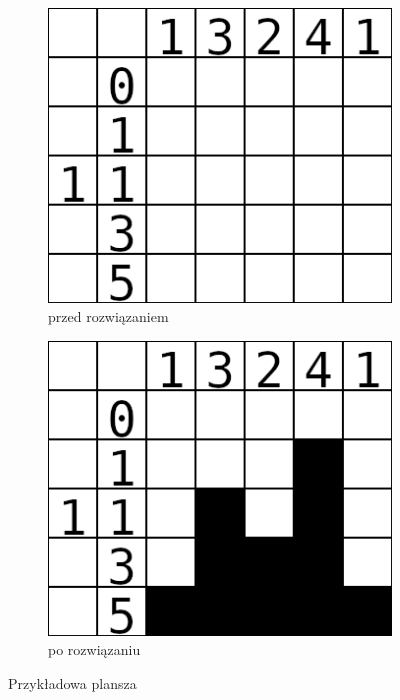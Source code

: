 \begin{figure}[!htb]
    \centering
    \begin{subfigure}[b]{0.3\textwidth}
        \centering
        \includegraphics[width=\textwidth]{images/nonogram_example_empty.png}
        \caption{przed rozwiązaniem}
    \end{subfigure}
    \begin{subfigure}[b]{0.3\textwidth}
        \centering
        \includegraphics[width=\textwidth]{images/nonogram_example_filled.png}
        \caption{po rozwiązaniu}
    \end{subfigure}
    \caption{Przykładowa plansza}
\end{figure}


